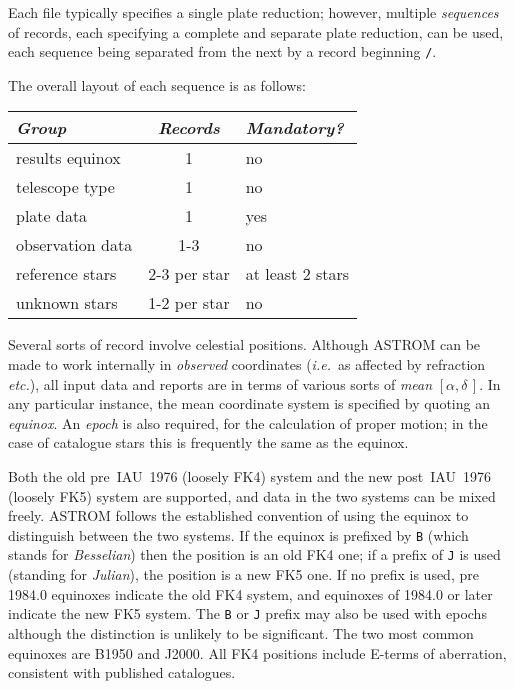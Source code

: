 \documentclass[twoside,11pt]{article}
\renewcommand{\_}{\texttt{\symbol{95}}}
\newcommand{\radec}     {$[\alpha,\delta\,]$}
\begin{document}
Each file typically specifies a single plate reduction;  however,
multiple \textit{sequences} of records, each specifying a complete
and separate plate reduction, can be used, each sequence being separated
from the next by a record beginning \texttt{/}.


\goodbreak

The overall layout of each sequence is as follows:

\begin{center}
\begin{tabular}{|l|c|l|}
\hline
\textit{Group} & \textit{Records} & \textit{Mandatory?} \\
\hline
results equinox  &   1           & no \\
telescope type   &   1           & no \\
plate data       &   1           & yes \\
observation data &   1-3         & no \\
reference stars  &  2-3 per star & at least 2 stars \\
unknown stars    &  1-2 per star & no \\
\hline
\end{tabular}
\end{center}

Several sorts of record involve celestial positions.  Although ASTROM
can be made to work internally in \textit{observed} coordinates
(\emph{i.e.}\ as affected by refraction \emph{etc.}), all input data
and reports are in terms of various sorts of \textit{mean} \radec.
In any particular instance, the mean coordinate system is specified
by quoting an \textit{equinox}.  An \textit{epoch} is also required,
for the calculation of proper motion;  in the case of catalogue stars
this is frequently the same as the equinox.

Both the old pre~IAU~1976 (loosely FK4) system and the new post~IAU~1976
(loosely FK5) system are supported, and data in the two systems can
be mixed freely.  ASTROM follows the established convention of using
the equinox to distinguish between the two systems.  If the equinox
is prefixed by \texttt{B} (which stands for \textit{Besselian})
then the position is an old FK4 one;  if a prefix of \texttt{J} is
used (standing for \textit{Julian}), the position is a new FK5 one.
If no prefix is used, pre 1984.0 equinoxes indicate the old FK4
system, and equinoxes of 1984.0 or later indicate the new FK5 system.
The \texttt{B} or \texttt{J} prefix may also be used with epochs
although the distinction is unlikely to be significant.  The two most
common equinoxes are B1950 and J2000.  All FK4 positions include E-terms
of aberration, consistent with published catalogues.
\end{document}
